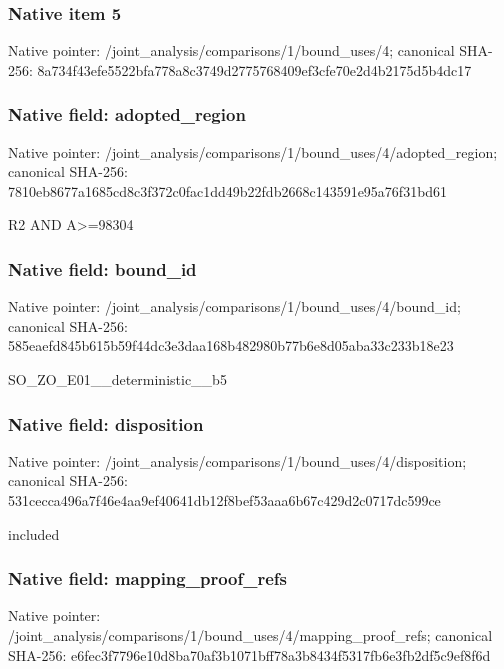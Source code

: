 \documentclass[10pt,a4paper]{article}
\begin{document}
\subsubsection{Native item 5}
Native pointer: /joint\_\allowbreak{}analysis/comparisons/1/bound\_\allowbreak{}uses/4; canonical SHA-256: 8a734f43efe5522bfa778a8c3749d2775768409ef3cfe70e2d4b2175d5b4dc17

\subsubsection{Native field: adopted\_\allowbreak{}region}
Native pointer: /joint\_\allowbreak{}analysis/comparisons/1/bound\_\allowbreak{}uses/4/adopted\_\allowbreak{}region; canonical SHA-256: 7810eb8677a1685cd8c3f372c0fac1dd49b22fdb2668c143591e95a76f31bd61

\begingroup\raggedright\sloppy R2 AND A>=\allowbreak{}98304\par\endgroup

\subsubsection{Native field: bound\_\allowbreak{}id}
Native pointer: /joint\_\allowbreak{}analysis/comparisons/1/bound\_\allowbreak{}uses/4/bound\_\allowbreak{}id; canonical SHA-256: 585eaefd845b615b59f44dc3e3daa168b482980b77b6e8d05aba33c233b18e23

\begingroup\raggedright\sloppy SO\_\allowbreak{}ZO\_\allowbreak{}E01\_\allowbreak{}\_\allowbreak{}deterministic\_\allowbreak{}\_\allowbreak{}b5\par\endgroup

\subsubsection{Native field: disposition}
Native pointer: /joint\_\allowbreak{}analysis/comparisons/1/bound\_\allowbreak{}uses/4/disposition; canonical SHA-256: 531cecca496a7f46e4aa9ef40641db12f8bef53aaa6b67c429d2c0717dc599ce

\begingroup\raggedright\sloppy included\par\endgroup

\subsubsection{Native field: mapping\_\allowbreak{}proof\_\allowbreak{}refs}
Native pointer: /joint\_\allowbreak{}analysis/comparisons/1/bound\_\allowbreak{}uses/4/mapping\_\allowbreak{}proof\_\allowbreak{}refs; canonical SHA-256: e6fec3f7796e10d8ba70af3b1071bff78a3b8434f5317fb6e3fb2df5c9ef8f6d
\end{document}
